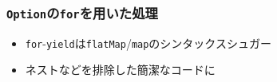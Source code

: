 \begin{frame}
  \frametitle{\protect\lstinline|Option|の\protect\lstinline|for|を用いた処理}


  \begin{itemize}
    \item<3-> \lstinline|for|-\lstinline|yield|は\lstinline|flatMap|/\lstinline|map|のシンタックスシュガー
    \item<4-> ネストなどを排除した簡潔なコードに
  \end{itemize}
\end{frame}


